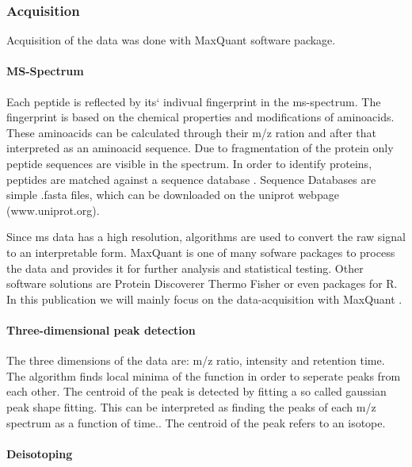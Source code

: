 \documentclass[
  11pt,
]{article}
\begin{document}
\hypertarget{acquisition}{%
\subsubsection{Acquisition}\label{acquisition}}

Acquisition of the data was done with MaxQuant \citep{Cox2008} software
package.

\hypertarget{ms-spectrum}{%
\paragraph{MS-Spectrum}\label{ms-spectrum}}

Each peptide is reflected by its` indivual fingerprint in the
ms-spectrum. The fingerprint is based on the chemical properties and
modifications of aminoacids. These aminoacids can be calculated through
their m/z ration and after that interpreted as an aminoacid sequence.
Due to fragmentation of the protein only peptide sequences are visible
in the spectrum. In order to identify proteins, peptides are matched
against a sequence database \citep{Cox2008}. Sequence Databases are
simple .fasta files, which can be downloaded on the uniprot webpage
(www.uniprot.org).

Since ms data has a high resolution, algorithms are used to convert the
raw signal to an interpretable form. MaxQuant is one of many sofware
packages to process the data and provides it for further analysis and
statistical testing. Other software solutions are Protein Discoverer
Thermo Fisher or even packages for R. In this publication we will mainly
focus on the data-acquisition with MaxQuant \citep{Cox2008}.

\hypertarget{three-dimensional-peak-detection}{%
\paragraph{Three-dimensional peak
detection}\label{three-dimensional-peak-detection}}

The three dimensions of the data are: m/z ratio, intensity and retention
time. The algorithm finds local minima of the function in order to
seperate peaks from each other. The centroid of the peak is detected by
fitting a so called gaussian peak shape fitting. This can be interpreted
as finding the peaks of each m/z spectrum as a function of time.. The
centroid of the peak refers to an isotope.

\hypertarget{deisotoping}{%
\paragraph{Deisotoping}\label{deisotoping}}
\end{document}

